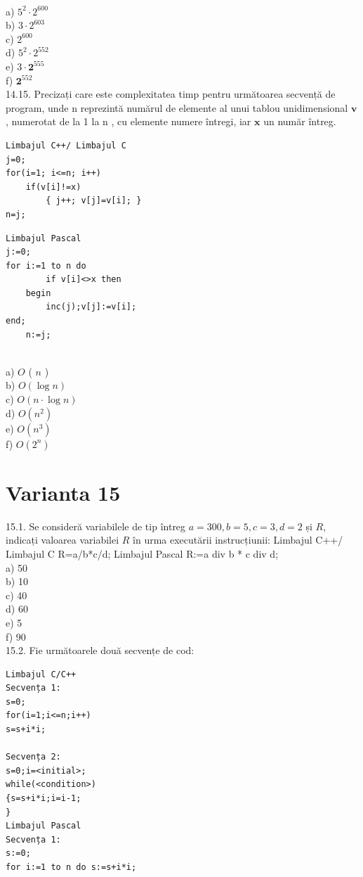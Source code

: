 {{\\
a) $5^{2} \cdot 2^{600}$
\\
b) $3 \cdot 2^{603}$
\\
c) $2^{600}$
\\
d) $5^{2} \cdot 2^{552}$
\\
e) $3 \cdot \mathbf{2}^{555}$
\\
f) $\mathbf{2}^{552}$
\\
14.15. Precizați care este complexitatea timp pentru următoarea secvență de program, unde n reprezintă numărul de elemente al unui tablou unidimensional $\mathbf{v}$, numerotat de la 1 la n , cu elemente numere întregi, iar $\mathbf{x}$ un număr întreg.
\begin{verbatim}
Limbajul C++/ Limbajul C
j=0;
for(i=1; i<=n; i++)
    if(v[i]!=x)
        { j++; v[j]=v[i]; }
n=j;
\end{verbatim}
\begin{verbatim}
Limbajul Pascal
j:=0;
for i:=1 to n do
        if v[i]<>x then
    begin
        inc(j);v[j]:=v[i];
end;
    n:=j;
\end{verbatim}
\\
a) $O$ ( $n$ )
\\
b) $O(\log n)$
\\
c) $O(n \cdot \log n)$
\\
d) $O\left(n^{2}\right)$
\\
e) $O\left(n^{3}\right)$
\\
f) $O\left(2^{n}\right)$
\\

\section*{Varianta 15}

15.1. Se consideră variabilele de tip întreg $a=300, b=5, c=3, d=2$ și $R$, indicați valoarea variabilei $R$ în urma executării instrucțiunii:
Limbajul C++/ Limbajul C R=a/b*c/d; Limbajul Pascal R:=a div b * c div d;
\\
a) 50
\\
b) 10
\\
c) 40
\\
d) 60
\\
e) 5
\\
f) 90
\\
15.2. Fie următoarele două secvențe de cod:
\begin{verbatim}
Limbajul C/C++ 
Secvența 1: 
s=0; 
for(i=1;i<=n;i++) 
s=s+i*i; 
 
Secvența 2: 
s=0;i=<initial>; 
while(<condition>) 
{s=s+i*i;i=i-1; 
}
Limbajul Pascal 
Secvența 1: 
s:=0; 
for i:=1 to n do s:=s+i*i; 
 

\end{verbatim}}}
